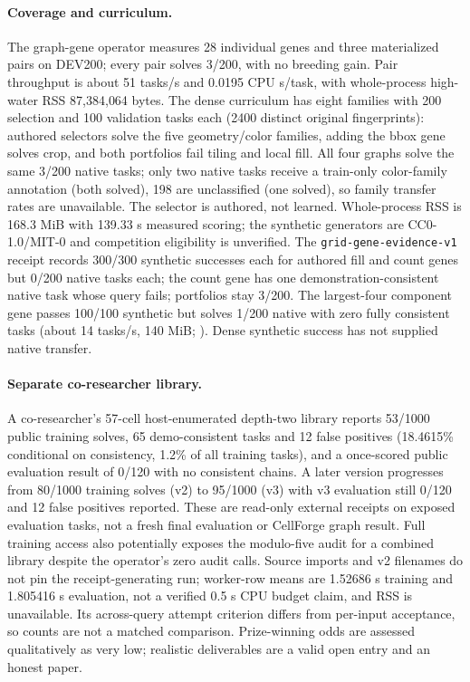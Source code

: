 \documentclass[11pt]{article}
\begin{document}
\paragraph{Coverage and curriculum.} The graph-gene operator measures 28 individual genes and three
materialized pairs on DEV200; every pair solves 3/200, with no breeding gain. Pair throughput is
about 51 tasks/s and 0.0195 CPU s/task, with whole-process high-water RSS 87{,}384{,}064 bytes. The
dense curriculum has eight families with 200 selection and 100 validation tasks each (2400 distinct
original fingerprints): authored selectors solve the five geometry/color families, adding the bbox
gene solves crop, and both portfolios fail tiling and local fill. All four graphs solve the same
3/200 native tasks; only two native tasks receive a train-only color-family annotation (both
solved), 198 are unclassified (one solved), so family transfer rates are unavailable. The selector
is authored, not learned. Whole-process RSS is 168.3 MiB with 139.33 s measured scoring; the
synthetic generators are CC0-1.0/MIT-0 and competition eligibility is unverified. The
\texttt{grid-gene-evidence-v1} receipt records 300/300 synthetic successes each for authored fill
and count genes but 0/200 native tasks each; the count gene has one demonstration-consistent native
task whose query fails; portfolios stay 3/200. The largest-four component gene passes 100/100
synthetic but solves 1/200 native with zero fully consistent tasks (about 14 tasks/s, 140 MiB;
). Dense synthetic success has not supplied native
transfer.

\paragraph{Separate co-researcher library.} A co-researcher's 57-cell host-enumerated depth-two
library reports 53/1000 public training solves, 65 demo-consistent tasks and 12 false positives
(18.4615\% conditional on consistency, 1.2\% of all training tasks), and a once-scored public
evaluation result of 0/120 with no consistent chains. A later version progresses from 80/1000
training solves (v2) to 95/1000 (v3) with v3 evaluation still 0/120 and 12 false positives
reported. These are read-only external receipts on exposed evaluation tasks, not a fresh final
evaluation or CellForge graph result. Full training access also potentially exposes the modulo-five
audit for a combined library despite the operator's zero audit calls. Source imports and v2
filenames do not pin the receipt-generating run; worker-row means are 1.52686 s training and 1.805416
s evaluation, not a verified 0.5 s CPU budget claim, and RSS is unavailable. Its across-query attempt
criterion differs from per-input acceptance, so counts are not a matched comparison.
Prize-winning odds are assessed qualitatively as very low; realistic deliverables are a valid
open entry and an honest paper.
\end{document}
